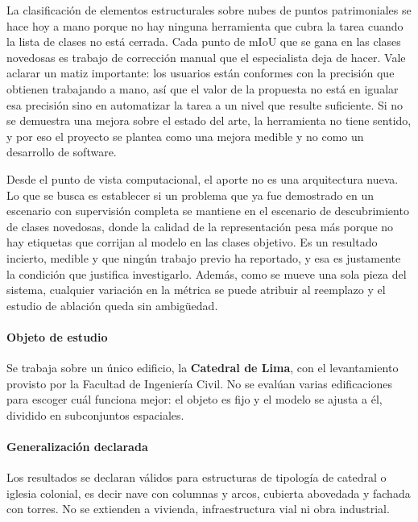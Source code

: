
La clasificación de elementos estructurales sobre nubes de puntos patrimoniales
se hace hoy a mano porque no hay ninguna herramienta que cubra la tarea cuando la
lista de clases no está cerrada. Cada punto de mIoU que se gana en las clases
novedosas es trabajo de corrección manual que el especialista deja de hacer. Vale
aclarar un matiz importante: los usuarios están conformes con la precisión que
obtienen trabajando a mano, así que el valor de la propuesta no está en igualar
esa precisión sino en automatizar la tarea a un nivel que resulte suficiente. Si
no se demuestra una mejora sobre el estado del arte, la herramienta no tiene
sentido, y por eso el proyecto se plantea como una mejora medible y no como un
desarrollo de software.

Desde el punto de vista computacional, el aporte no es una arquitectura nueva.
Lo que se busca es establecer si un problema que ya fue demostrado en un
escenario con supervisión completa se mantiene en el escenario de descubrimiento
de clases novedosas, donde la calidad de la representación pesa más porque no hay
etiquetas que corrijan al modelo en las clases objetivo. Es un resultado
incierto, medible y que ningún trabajo previo ha reportado, y esa es justamente
la condición que justifica investigarlo. Además, como se mueve una sola pieza del
sistema, cualquier variación en la métrica se puede atribuir al reemplazo y el
estudio de ablación queda sin ambigüedad.


\paragraph*{Objeto de estudio}
Se trabaja sobre un único edificio, la \textbf{Catedral de Lima}, con el
levantamiento provisto por la Facultad de Ingeniería Civil. No se evalúan varias
edificaciones para escoger cuál funciona mejor: el objeto es fijo y el modelo se
ajusta a él, dividido en subconjuntos espaciales.

\paragraph*{Generalización declarada}
Los resultados se declaran válidos para estructuras de tipología de catedral o
iglesia colonial, es decir nave con columnas y arcos, cubierta abovedada y
fachada con torres. No se extienden a vivienda, infraestructura vial ni obra
industrial.

